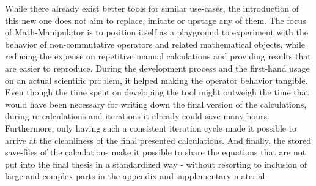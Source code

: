 While there already exist better tools for similar use-cases, the introduction of this new one does not aim to replace, imitate or upstage any of them.
The focus of Math-Manipulator is to position itself as a playground to experiment with the behavior of non-commutative operators and related mathematical objects, while reducing the expense on repetitive manual calculations and providing results that are easier to reproduce.
During the development process and the first-hand usage on an actual scientific problem, it helped making the operator behavior tangible.
Even though the time spent on developing the tool might outweigh the time that would have been necessary for writing down the final version of the calculations, during re-calculations and iterations it already could save many hours.
Furthermore, only having such a consistent iteration cycle made it possible to arrive at the cleanliness of the final presented calculations.
And finally, the stored save-files of the calculations make it possible to share the equations that are not put into the final thesis in a standardized way - without resorting to inclusion of large and complex parts in the appendix and supplementary material.
